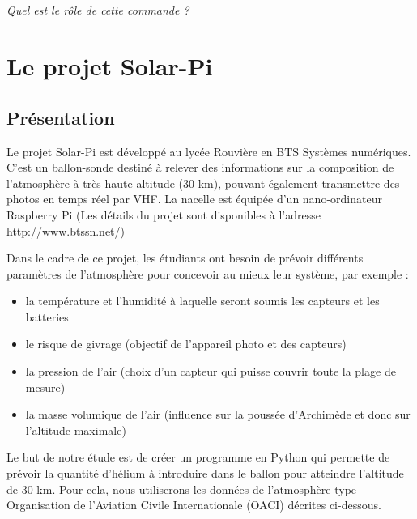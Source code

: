 \documentclass[10pt]{article}
\begin{document}
\subparagraph{}
\textit{Quel est le rôle de cette commande ?}



\section{Le projet Solar-Pi}
\setcounter{subparagraph}{0}
\subsection{Présentation}

Le projet Solar-Pi est développé au lycée Rouvière en BTS Systèmes numériques. C'est un ballon-sonde destiné à relever des informations sur la composition de l'atmosphère à très haute altitude (30 km), pouvant également transmettre des photos en temps réel par VHF. La nacelle est équipée d'un nano-ordinateur Raspberry Pi (Les détails du projet sont disponibles à l'adresse http://www.btssn.net/)

\begin{center}
\end{center}


Dans le cadre de ce projet, les étudiants ont besoin de prévoir différents paramètres de l'atmosphère pour concevoir au mieux leur système, par exemple :
\begin{itemize}
\item la température et l'humidité à laquelle seront soumis les capteurs et les batteries
\item le risque de givrage (objectif de l'appareil photo et des capteurs)
\item la pression de l'air (choix d'un capteur qui puisse couvrir toute la plage de mesure)
\item la masse volumique de l'air (influence sur la poussée d'Archimède et donc sur l'altitude maximale)
\end{itemize}

\begin{obj}

Le but de notre étude est de créer un programme en Python qui permette de prévoir la quantité d'hélium à introduire dans le ballon pour atteindre l'altitude de 30 km. Pour cela, nous utiliserons les données de l'atmosphère type Organisation de l'Aviation Civile Internationale (OACI) décrites ci-dessous.

\end{obj}
\end{document}
